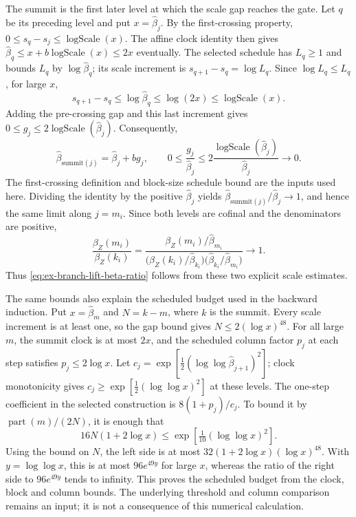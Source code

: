 The summit is the first later level at which the scale gap reaches the
gate. Let $q$ be its preceding level and put $x=\widehat\beta_j$. By the
first-crossing property, $0\le s_q-s_j\le\operatorname{logScale}(x)$.
The affine clock identity then gives
$\widehat\beta_q\le x+b\operatorname{logScale}(x)\le2x$ eventually. The
selected schedule has $L_q\ge1$ and bounds $L_q$ by
$\log\widehat\beta_q$; its scale increment is
$s_{q+1}-s_q=\log L_q$. Since $\log L_q\le L_q$, for large $x$,
\[
 s_{q+1}-s_q\le\log\widehat\beta_q
 \le\log(2x)\le\operatorname{logScale}(x).
\]
Adding the pre-crossing gap and this last increment gives
$0\le g_j\le2\operatorname{logScale}(\widehat\beta_j)$. Consequently,
\[
 \widehat\beta_{\mathrm{summit}(j)}
   =\widehat\beta_j+b g_j,\qquad
 0\le\frac{g_j}{\widehat\beta_j}
 \le 2\frac{\operatorname{logScale}(\widehat\beta_j)}{\widehat\beta_j}
 \longrightarrow0.
\]
The first-crossing definition and block-size schedule bound are the inputs
used here. Dividing the identity by the positive $\widehat\beta_j$ yields
$\widehat\beta_{\mathrm{summit}(j)}/\widehat\beta_j\to1$, and hence the
same limit along $j=m_i$. Since both levels are cofinal and the
denominators are positive,
\[
 \frac{\beta_Z(m_i)}{\beta_Z(k_i)}=
 \frac{\beta_Z(m_i)/\widehat\beta_{m_i}}
 {\bigl(\beta_Z(k_i)/\widehat\beta_{k_i}\bigr)
  \bigl(\widehat\beta_{k_i}/\widehat\beta_{m_i}\bigr)}
 \longrightarrow1.
\]
Thus \eqref{eq:ex-branch-lift-beta-ratio} follows from these two explicit
scale estimates.

The same bounds also explain the scheduled budget used in the backward
induction. Put $x=\widehat\beta_m$ and $N=k-m$, where $k$ is the summit.
Every scale increment is at least one, so the gap bound gives
$N\le2(\log x)^{48}$. For all large $m$, the summit clock is at most
$2x$, and the scheduled column factor $p_j$ at each step satisfies
$p_j\le2\log x$. Let
$c_j=\exp[\tfrac12(\log\log\widehat\beta_{j+1})^2]$; clock monotonicity
gives $c_j\ge\exp[\tfrac12(\log\log x)^2]$ at these levels. The
one-step coefficient in the selected construction is
$8(1+p_j)/c_j$. To bound it by $\operatorname{part}(m)/(2N)$, it is
enough that
\[
 16N(1+2\log x)\le\exp[\tfrac1{10}(\log\log x)^2].
\]
Using the bound on $N$, the left side is at most
$32(1+2\log x)(\log x)^{48}$. With $y=\log\log x$, this is at most
$96e^{49y}$ for large $x$, whereas the ratio of the right side to
$96e^{49y}$ tends to infinity. This proves the scheduled budget from the
clock, block and column bounds. The underlying threshold and column
comparison remains an input; it is not a consequence of this numerical
calculation.

